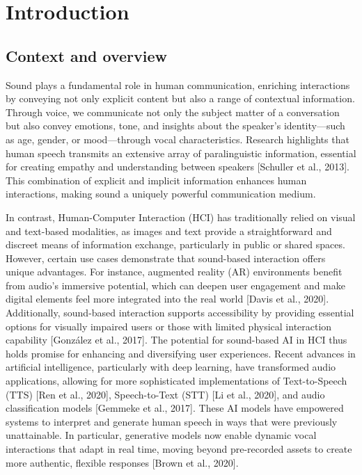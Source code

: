 \section{Introduction}

\subsection{Context and overview}

Sound plays a fundamental role in human communication, enriching interactions by conveying not only explicit content but also a range of contextual information. Through voice, we communicate not only the subject matter of a conversation but also convey emotions, tone, and insights about the speaker’s identity—such as age, gender, or mood—through vocal characteristics. Research highlights that human speech transmits an extensive array of paralinguistic information, essential for creating empathy and understanding between speakers [Schuller et al., 2013]. This combination of explicit and implicit information enhances human interactions, making sound a uniquely powerful communication medium.

In contrast, Human-Computer Interaction (HCI) has traditionally relied on visual and text-based modalities, as images and text provide a straightforward and discreet means of information exchange, particularly in public or shared spaces. However, certain use cases demonstrate that sound-based interaction offers unique advantages. For instance, augmented reality (AR) environments benefit from audio's immersive potential, which can deepen user engagement and make digital elements feel more integrated into the real world [Davis et al., 2020]. Additionally, sound-based interaction supports accessibility by providing essential options for visually impaired users or those with limited physical interaction capability [González et al., 2017].
The potential for sound-based AI in HCI thus holds promise for enhancing and diversifying user experiences. Recent advances in artificial intelligence, particularly with deep learning, have transformed audio applications, allowing for more sophisticated implementations of Text-to-Speech (TTS) [Ren et al., 2020], Speech-to-Text (STT) [Li et al., 2020], and audio classification models [Gemmeke et al., 2017]. These AI models have empowered systems to interpret and generate human speech in ways that were previously unattainable. In particular, generative models now enable dynamic vocal interactions that adapt in real time, moving beyond pre-recorded assets to create more authentic, flexible responses [Brown et al., 2020].




